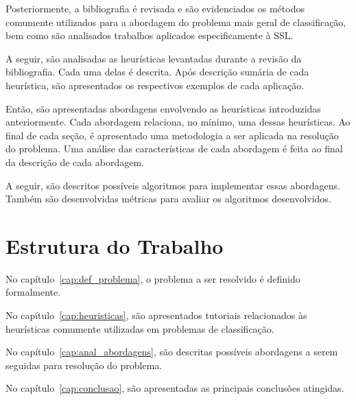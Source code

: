 Posteriormente, a bibliografia é revisada e são evidenciados os métodos comumente
utilizados para a abordagem do problema mais geral de classificação, bem como são
analisados trabalhos aplicados especificamente à SSL.

A seguir, são analisadas as heurísticas levantadas durante a
revisão da bibliografia. Cada uma delas é descrita. Após descrição sumária
de cada heurística, são apresentados os respectivos exemplos de cada aplicação.

Então, são apresentadas abordagens envolvendo as heurísticas introduzidas
anteriormente. Cada abordagem relaciona, no mínimo, uma dessas heurísticas.
Ao final de cada seção, é apresentado uma metodologia a ser aplicada
na resolução do problema. Uma análise das características de cada abordagem
é feita ao final da descrição de cada abordagem.

A seguir, são descritos possíveis algoritmos para implementar essas abordagens. Também são
desenvolvidas métricas para avaliar os algoritmos desenvolvidos.


\section{Estrutura do Trabalho}

No capítulo~\ref{cap:def_problema}, o problema a ser resolvido é definido formalmente.


No capítulo~\ref{cap:heuristicas}, são apresentados tutoriais relacionados às
heurísticas comumente utilizadas em problemas de classificação.

No capítulo~\ref{cap:anal_abordagens}, são descritas possíveis abordagens a serem
seguidas para resolução do problema.

No capítulo~\ref{cap:conclusao}, são apresentadas as principais conclusões atingidas.
